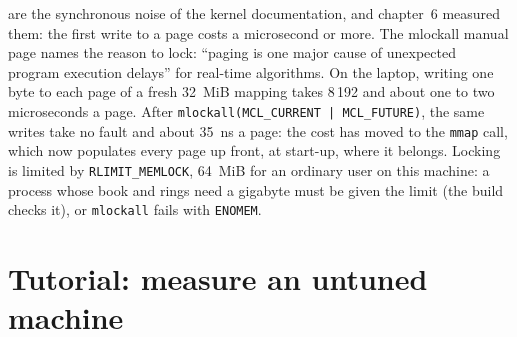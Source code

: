  are the synchronous noise of the kernel documentation, and chapter~6 measured them: the first write to a page
costs a microsecond or more. The mlockall manual page names the reason to lock: ``paging is one major cause of unexpected
program execution delays'' for real-time algorithms. On the laptop, writing one byte to each page of a fresh 32~MiB mapping
takes 8\,192  and about one to two microseconds a page. After \texttt{mlockall(MCL\_CURRENT | MCL\_FUTURE)}, the
same writes take no fault and about \qty{35}{\nano\second} a page: the cost has moved to the \texttt{mmap} call, which now
populates every page up front, at start-up, where it belongs. Locking is limited by \texttt{RLIMIT\_MEMLOCK}, 64~MiB for an
ordinary user on this machine: a process whose book and rings need a gigabyte must be given the limit (the build checks it),
or \texttt{mlockall} fails with \texttt{ENOMEM}.

\section{Tutorial: measure an untuned machine}\label{tut:ll:linux-tuning:tut}

